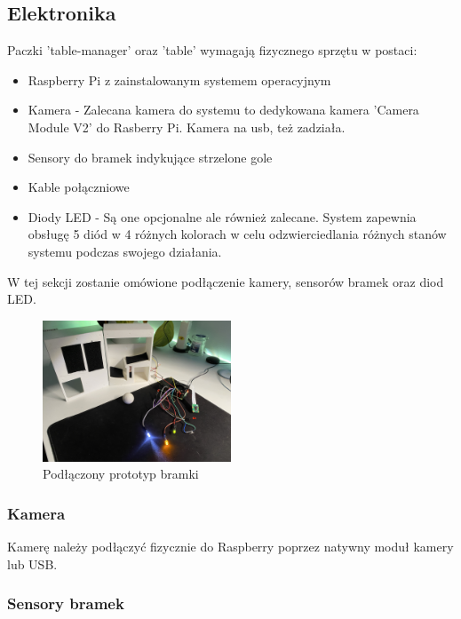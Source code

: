 \subsection{Elektronika}

Paczki 'table-manager' oraz 'table' wymagają fizycznego sprzętu w postaci:

\begin{itemize}
	\item Raspberry Pi z zainstalowanym systemem operacyjnym
	\item Kamera - Zalecana kamera do systemu to dedykowana kamera 'Camera Module V2' do Rasberry Pi. Kamera na usb, też zadziała.
	\item Sensory do bramek indykujące strzelone gole
	\item Kable połączniowe
	\item Diody LED - Są one opcjonalne ale również zalecane. System zapewnia obsługę 5 diód w 4 różnych kolorach w celu odzwierciedlania różnych stanów systemu podczas swojego działania.
\end{itemize}

W tej sekcji zostanie omówione podłączenie kamery, sensorów bramek oraz diod LED.

\begin{figure}[h!]
  \centering
    \includegraphics[width=0.5\textwidth]{images/hardware/prototyp-bramki.jpg}
  \caption{Podłączony prototyp bramki}
  \label{fig:mobile}
\end{figure}

\subsubsection{Kamera}

Kamerę należy podłączyć fizycznie do Raspberry poprzez natywny moduł kamery lub USB.

\subsubsection{Sensory bramek}

